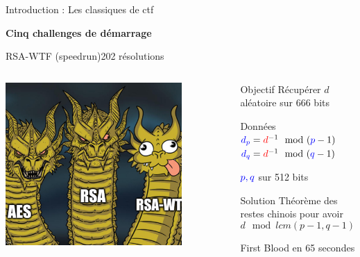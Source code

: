\begin{frame}{Introduction : Les classiques de ctf}
    \large{\centerline{\textbf{Cinq challenges de démarrage}}}

\end{frame}


\begin{frame}{RSA-WTF \FiveStar (speedrun)\hfill 202 résolutions}
    \begin{columns}[c]
        \begin{center}                  
            \includegraphics[width=0.8\textwidth]{img/meme/rsa-wtf-intro.png}
        \end{center}

           \begin{outline}
               \1 Objectif
                \2 Récupérer \u{$d$} aléatoire sur 666 bits

            \pause
               \1 Données
                \2 $\textcolor{blue}{d_p} = \textcolor{red}{d}^{-1} \mod (\textcolor{blue}{p}-1)$
                \2 $\textcolor{blue}{d_q} = \textcolor{red}{d}^{-1} \mod (\textcolor{blue}{q}-1)$

                \pause
                
                \2 $\textcolor{blue}{p, q}$ sur 512 bits

            \pause
               \1 Solution
                \2 Théorème des restes chinois pour avoir
                    \[d \mod lcm(p-1,q-1) \]
            
            \pause
               \1 First Blood en 65 secondes \flag{}
           \end{outline}
    \end{columns}
\end{frame}

